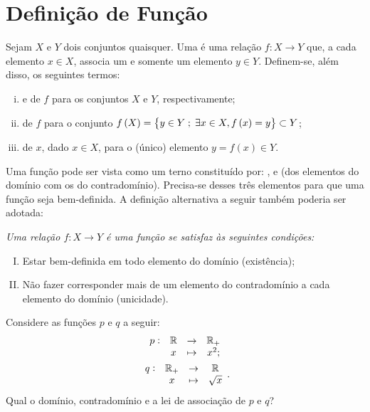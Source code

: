 \section{Definição de Função}

\begin{definition}
Sejam $X$ e $Y$ dois conjuntos quaisquer. Uma  é uma relação $f: X \to Y$ que, a cada elemento $x \in X$, associa um e somente um elemento $y \in Y$. Definem-se, além disso, os seguintes termos:
%
\begin{enumerate}[(i)]
  \item {} e  de $f$ para os conjuntos $X$ e $Y$, respectivamente;
  \item {} de $f$ para o conjunto $f\left(X\right) = \left\{y \in Y \;;\; \exists x \in X , f \left(x\right) =
  y\right\} \subset Y$;
  \item {} de $x$, dado $x \in X$, para o (único) elemento $y = f(x) \in Y$.
\end{enumerate}
\end{definition}

\begin{remark}
Uma função pode ser vista como um terno constituído por: ,  e  (dos elementos do
domínio com os do contradomínio). Precisa-se desses três elementos para que uma função seja bem-definida. A definição alternativa a seguir também poderia ser adotada:

{\it Uma relação $f: X \to Y$ é uma \emph {função} se satisfaz às seguintes condições:
%
\begin{enumerate}[(I)]
  \item Estar bem-definida em todo elemento do domínio (existência);
  \item Não fazer corresponder mais de um elemento do contradomínio
  a cada elemento do domínio (unicidade).
\end{enumerate}}
\end{remark}

\begin{example}
Considere as funções $p$ e $q$ a seguir:
%
\begin{gather*}
\begin{array}{cccc}
p : & \mathbb{R} & \to     & \mathbb{R}_+ \\
     &  x & \mapsto & x^2;
\end{array}\\
\begin{array}{cccc}
q : & \mathbb{R}_+ & \to     & \mathbb{R} \\
     &  x & \mapsto & \sqrt x
\end{array}.
\end{gather*}
%
Qual o domínio, contradomínio e a lei de associação de $p$ e $q$?
\end{example}

